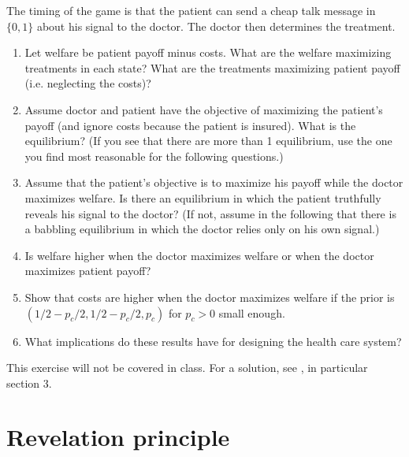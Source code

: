 \documentclass[a4paper,12pt]{article}
\begin{document}
\begin{enumerate}
The timing of the game is that the patient can send a cheap talk message in $\{0,1\}$ about his signal to the doctor. The doctor then determines the treatment.

\begin{enumerate}
\item Let welfare be patient payoff minus costs. What are the welfare maximizing treatments in each state? What are the treatments maximizing patient payoff (i.e. neglecting the costs)? 
\item Assume doctor and patient have the objective of maximizing the patient's payoff (and ignore costs because the patient is insured). What is the equilibrium? (If you see that there are more than 1 equilibrium, use the one you find most reasonable for the following questions.)
\item Assume that the patient's objective is to maximize his payoff while the doctor maximizes welfare. Is there an equilibrium in which the patient truthfully reveals his signal to the doctor? (If not, assume in the following that there is a babbling equilibrium in which the doctor relies only on his own signal.)
\item Is welfare higher when the doctor maximizes welfare or when the doctor maximizes patient payoff?
\item Show that costs are higher when the doctor maximizes welfare if the prior is $(1/2-p_c/2,1/2-p_c/2,p_c)$ for $p_c>0$ small enough.
  \item What implications do these results have for designing the health care system?
\end{enumerate}

This exercise will not be covered in class. For a solution, see \cite{schottmueller2013cifd}, in particular section 3.

\end{enumerate}

\section{Revelation principle}
\label{sec:revelation-principle}
\end{document}
